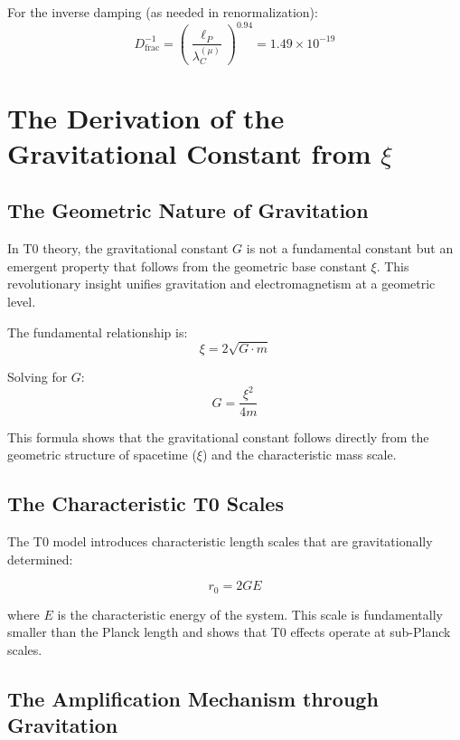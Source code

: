 \documentclass[12pt,a4paper]{article}
\theoremstyle{definition}
\begin{document}
	For the inverse damping (as needed in renormalization):
	\begin{equation}
		D_{\text{frac}}^{-1} = \left(\frac{\ell_P}{\lambda_C^{(\mu)}}\right)^{0.94} = 1.49 \times 10^{-19}
	\end{equation}
	
	\section{The Derivation of the Gravitational Constant from $\xi$}
	
	\subsection{The Geometric Nature of Gravitation}
	
	In T0 theory, the gravitational constant $G$ is not a fundamental constant but an emergent property that follows from the geometric base constant $\xi$. This revolutionary insight unifies gravitation and electromagnetism at a geometric level.
	
	The fundamental relationship is:
	\begin{equation}
		\xi = 2\sqrt{G \cdot m}
	\end{equation}
	
	Solving for $G$:
	\begin{equation}
		G = \frac{\xi^2}{4m}
	\end{equation}
	
	This formula shows that the gravitational constant follows directly from the geometric structure of spacetime ($\xi$) and the characteristic mass scale.
	
	\subsection{The Characteristic T0 Scales}
	
	The T0 model introduces characteristic length scales that are gravitationally determined:
	
	\begin{equation}
		r_0 = 2GE
	\end{equation}
	
	where $E$ is the characteristic energy of the system. This scale is fundamentally smaller than the Planck length and shows that T0 effects operate at sub-Planck scales.
	
	\subsection{The Amplification Mechanism through Gravitation}
	
\end{document}
